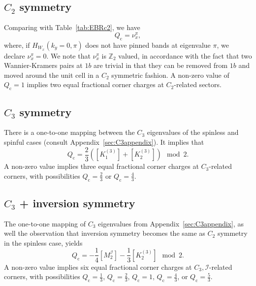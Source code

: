 \subsection{$C_2$ symmetry}
Comparing with Table~\ref{tab:EBRc2}, we have
\begin{equation}
Q_\mathrm{c} = \nu_{x}^{\pi},
\end{equation}
where, if $H_{W_x} (k_y=0,\pi)$ does not have pinned bands at eigenvalue $\pi$, we declare $\nu_{x}^{\pi} = 0$. We note that $\nu_{x}^{\pi}$ is $\mathbb{Z}_2$ valued, in accordance with the fact that two Wannier-Kramers pairs at $1b$ are trivial in that they can be removed from $1b$ and moved around the unit cell in a $C_2$ symmetric fashion. A non-zero value of $Q_\mathrm{c} = 1$ implies two equal fractional corner charges at $C_2$-related sectors.

\subsection{$C_3$ symmetry}
There is a one-to-one mapping between the $C_3$ eigenvalues of the spinless and spinful cases (consult Appendix~\ref{sec:C3appendix}). It implies that
\begin{equation}
Q_{\mathrm{c}} = \frac{2}{3} \left([K^{(3)}_1]+[K^{(3)}_2]\right) \mod 2.
\end{equation}
A non-zero value implies three equal fractional corner charges at $C_3$-related corners, with possibilities $Q_\mathrm{c} = \frac{2}{3}$ or $Q_\mathrm{c} = \frac{4}{3}$.

\subsection{$C_3$ + inversion symmetry}
The one-to-one mapping of $C_3$ eigenvalues from Appendix~\ref{sec:C3appendix}, as well the observation that inversion symmetry becomes the same as $C_2$ symmetry in the spinless case, yields
\begin{equation}
Q_\mathrm{c} = - \frac{1}{4} [M^\mathcal{I}_2] -\frac{1}{3} [K^{(3)}_2] \mod 2.
\label{eq:C3InvQc}
\end{equation}
A non-zero value implies six equal fractional corner charges at $C_3, \mathcal{I}$-related corners, with possibilities $Q_\mathrm{c} = \frac{1}{3}$, $Q_\mathrm{c} = \frac{2}{3}$, $Q_\mathrm{c} = 1$, $Q_\mathrm{c} = \frac{4}{3}$, or $Q_\mathrm{c} = \frac{5}{3}$.

